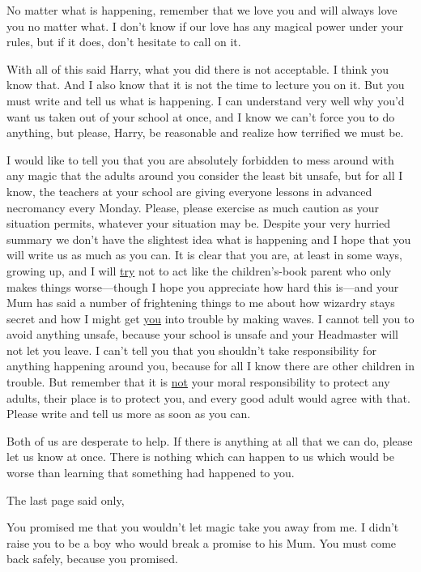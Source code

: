 \begin{writtenNote}
No matter what is happening, remember that we love you and will always
love you no matter what. I don't know if our love has any magical power under
your rules, but if it does, don't hesitate to call on it.

With all of this said{\el} Harry, what you did there is not
acceptable. I think you know that. And I also know that it is not the time to
lecture you on it. But you must write and tell us what is happening. I can
understand very well why you'd want us taken out of your school at once, and I
know we can't force you to do anything, but please, Harry, be reasonable and
realize how terrified we must be.

I would like to tell you that you are absolutely forbidden to mess around
with any magic that the adults around you consider the least bit unsafe, but
for all I know, the teachers at your school are giving everyone lessons in
advanced necromancy every Monday. Please, please exercise as much caution as
your situation permits, whatever your situation may be. Despite your very
hurried summary we don't have the slightest idea what is happening and I hope
that you will write us as much as you can. It is clear that you are, at least
in some ways, growing up, and I will \underline{try} not to act like the
children's-book parent who only makes things worse—though I hope you
appreciate how hard this is—and your Mum has said a number of frightening
things to me about how wizardry stays secret and how I might get
\underline{you} into trouble by making waves. I cannot tell you to avoid
anything unsafe, because your school is unsafe and your Headmaster will not let
you leave. I can't tell you that you shouldn't take responsibility for anything
happening around you, because for all I know there are other children in
trouble. But remember that it is \underline{not} your moral responsibility to
protect any adults, their place is to protect you, and every good adult would
agree with that. Please write and tell us more as soon as you can.

Both of us are desperate to help. If there is anything at all that we can
do, please let us know at once. There is nothing which can happen to us which
would be worse than learning that something had happened to you.

\end{writtenNote}

The last page said only,

\begin{writtenNote}
You promised me that you wouldn't let magic take you away from me. I
didn't raise you to be a boy who would break a promise to his Mum. You must
come back safely, because you promised.

\end{writtenNote}

